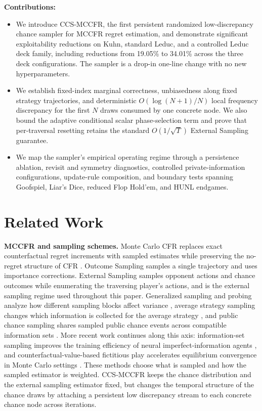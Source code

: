 \documentclass[11pt]{article}
\begin{document}
\textbf{Contributions:}
\begin{itemize}
\item We introduce CCS-MCCFR, the first persistent randomized low-discrepancy chance sampler for MCCFR regret estimation, and demonstrate significant exploitability reductions on Kuhn, standard Leduc, and a controlled Leduc deck family, including reductions from 19.05\% to 34.01\% across the three deck configurations. The sampler is a drop-in one-line change with no new hyperparameters.
\item We establish fixed-index marginal correctness, unbiasedness along fixed strategy trajectories, and deterministic $O(\!\log(N+1)/N)$ local frequency discrepancy for the first $N$ draws consumed by one concrete node. We also bound the adaptive conditional scalar phase-selection term and prove that per-traversal resetting retains the standard $O(1/\sqrt{T})$ External Sampling guarantee.
\item We map the sampler's empirical operating regime through a persistence ablation, revisit and symmetry diagnostics, controlled private-information configurations, update-rule composition, and boundary tests spanning Goofspiel, Liar's Dice, reduced Flop Hold'em, and HUNL endgames.
\end{itemize}


\section{Related Work}
\label{sec:related}

\textbf{MCCFR and sampling schemes.} Monte Carlo CFR replaces exact counterfactual regret increments with sampled estimates while preserving the no-regret structure of CFR \citep{lanctot2009monte}. Outcome Sampling samples a single trajectory and uses importance corrections. External Sampling samples opponent actions and chance outcomes while enumerating the traversing player's actions, and is the external sampling regime used throughout this paper. Generalized sampling and probing analyze how different sampling blocks affect variance \citep{gibson2012generalized}, average strategy sampling changes which information is collected for the average strategy \citep{burch2012efficient}, and public chance sampling shares sampled public chance events across compatible information sets \citep{johanson2012efficient}. More recent work continues along this axis: information-set sampling improves the training efficiency of neural imperfect-information agents \citep{bertram2024efficiently}, and counterfactual-value-based fictitious play accelerates equilibrium convergence in Monte Carlo settings \citep{qi2024accelerating}. These methods choose what is sampled and how the sampled estimator is weighted. CCS-MCCFR keeps the chance distribution and the external sampling estimator fixed, but changes the temporal structure of the chance draws by attaching a persistent low discrepancy stream to each concrete chance node across iterations.
\end{document}
